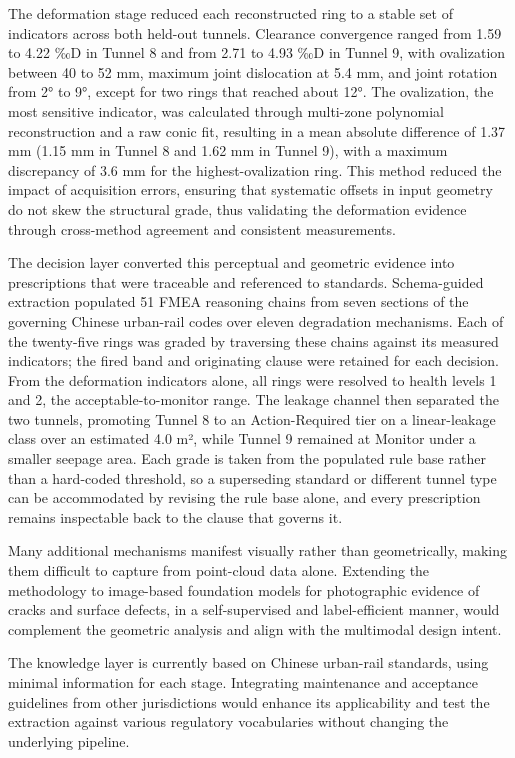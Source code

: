 \documentclass[preprint,12pt,authoryear]{elsarticle}
\begin{document}
The deformation stage reduced each reconstructed ring to a stable set of
indicators across both held-out tunnels. Clearance convergence ranged
from 1.59 to 4.22 ‰D in Tunnel 8 and from 2.71 to 4.93 ‰D in Tunnel 9,
with ovalization between 40 to 52 mm, maximum joint dislocation at 5.4
mm, and joint rotation from 2° to 9°, except for two rings that reached
about 12°. The ovalization, the most sensitive indicator, was calculated
through multi-zone polynomial reconstruction and a raw conic fit,
resulting in a mean absolute difference of 1.37 mm (1.15 mm in Tunnel 8
and 1.62 mm in Tunnel 9), with a maximum discrepancy of 3.6 mm for the
highest-ovalization ring. This method reduced the impact of acquisition
errors, ensuring that systematic offsets in input geometry do not skew
the structural grade, thus validating the deformation evidence through
cross-method agreement and consistent measurements.

The decision layer converted this perceptual and geometric evidence into
prescriptions that were traceable and referenced to standards.
Schema-guided extraction populated 51 FMEA reasoning chains from seven
sections of the governing Chinese urban-rail codes over eleven
degradation mechanisms. Each of the twenty-five rings was graded by
traversing these chains against its measured indicators; the fired band
and originating clause were retained for each decision. From the
deformation indicators alone, all rings were resolved to health levels 1
and 2, the acceptable-to-monitor range. The leakage channel then
separated the two tunnels, promoting Tunnel 8 to an Action-Required tier
on a linear-leakage class over an estimated 4.0 m², while Tunnel 9
remained at Monitor under a smaller seepage area. Each grade is taken
from the populated rule base rather than a hard-coded threshold, so a
superseding standard or different tunnel type can be accommodated by
revising the rule base alone, and every prescription remains inspectable
back to the clause that governs it.

Many additional mechanisms manifest visually rather than geometrically,
making them difficult to capture from point-cloud data alone. Extending
the methodology to image-based foundation models for photographic
evidence of cracks and surface defects, in a self-supervised and
label-efficient manner, would complement the geometric analysis and
align with the multimodal design intent.

The knowledge layer is currently based on Chinese urban-rail standards,
using minimal information for each stage. Integrating maintenance and
acceptance guidelines from other jurisdictions would enhance its
applicability and test the extraction against various regulatory
vocabularies without changing the underlying pipeline.
\end{document}
